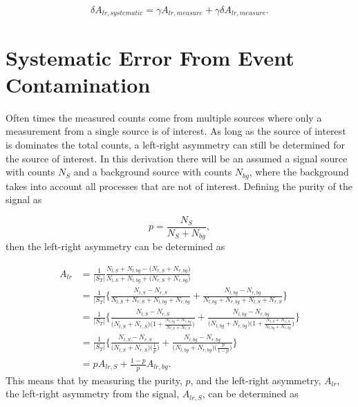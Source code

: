 \begin{equation}
  \delta A_{lr,systematic} =
  \gamma A_{lr,measure} +
  \gamma \delta A_{lr,measure}.
\end{equation}


\section{Systematic Error From Event Contamination} \label{app::sysEventContam}
Often times the measured counts come from multiple sources where only a
measurement from a single source is of interest.  As long as the source of
interest is dominates the total counts, a left-right asymmetry can still be
determined for the source of interest.  In this derivation there will be an
assumed a signal source with counts $N_S$ and a background source with counts
$N_{bg}$, where the background takes into account all processes that are not of
interest.  Defining the purity of the signal as

\begin{equation}
  p = \frac{N_S}{N_S + N_{bg}},
\end{equation}
\noindent
then the left-right asymmetry can be determined as

\begin{align}
  A_{lr} &= \frac{1}{|S_T|}
  \frac{N_{l,S} + N_{l,bg} - \Big(N_{r,S} + N_{r,bg}\Big)
  }{N_{l,S} + N_{l,bg} + \Big(N_{r,S} + N_{r,bg} \Big)}
  \\ \nonumber
  &= \frac{1}{|S_T|}\Big\{
  \frac{N_{l,S} - N_{r,S}}{N_{l,S} + N_{r,S} + N_{l,bg} + N_{r,bg}} 
  + \frac{N_{l,bg} - N_{r,bg}}{N_{l,bg} + N_{r,bg} + N_{l,S} + N_{r,S} }
  \Big\}
  \\ \nonumber
  &= \frac{1}{|S_T|}\Big\{
  \frac{N_{l,S} - N_{r,S}}{
    \Big(N_{l,S} + N_{r,S}\Big)\Big(1+ \frac{N_{l,bg} + N_{r,bg}}{N_{l,S} + N_{r,S}}\Big)}
  + \frac{N_{l,bg} - N_{r,bg}}{\Big(N_{l,bg} + N_{r,bg}\Big)\Big(1+ \frac{N_{l,S} + N_{r,S}}{N_{l,bg} + N_{r,bg}}\Big) }
  \Big\}
  \\ \nonumber
  &= \frac{1}{|S_T|}\Big\{
  \frac{N_{l,S} - N_{r,S}}{
    \Big(N_{l,S} + N_{r,S}\Big)\Big(\frac{1}{p}\Big)}
  + \frac{N_{l,bg} - N_{r,bg}}{\Big(N_{l,bg} + N_{r,bg}\Big)\Big(\frac{p}{1-p}\Big) }
  \Big\}
  \\ \nonumber
  &= pA_{lr,S} + \frac{1-p}{p}A_{lr,bg}.
\end{align}
\noindent
This means that by measuring the purity, $p$, and the left-right asymmetry,
$A_{lr}$, the left-right asymmetry from the signal, $A_{lr,S}$, can be
determined as

